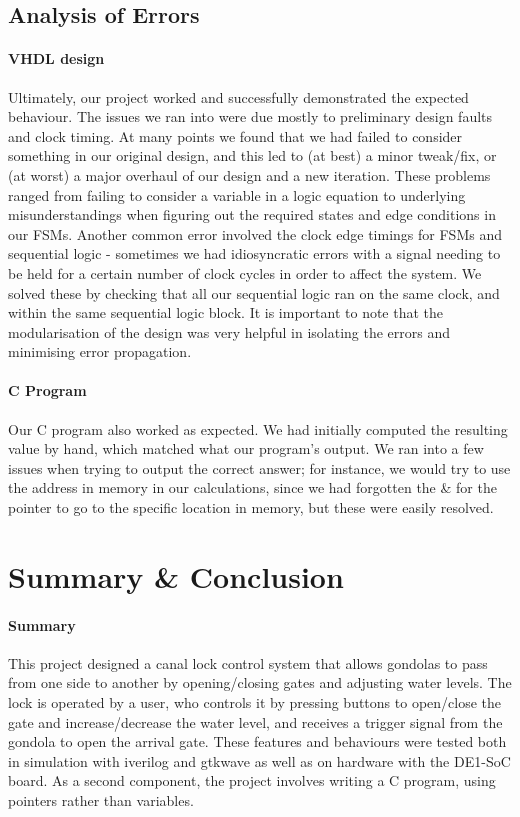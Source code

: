 \documentclass{article}
\begin{document}
	\subsection{Analysis of Errors}
  \paragraph{VHDL design} Ultimately, our project worked and successfully demonstrated the expected behaviour. The issues we ran into were due mostly to preliminary design faults and clock timing. At many points we found that we had failed to consider something in our original design, and this led to (at best) a minor tweak/fix, or (at worst) a major overhaul of our design and a new iteration. These problems ranged from failing to consider a variable in a logic equation to underlying misunderstandings when figuring out the required states and edge conditions in our FSMs. Another common error involved the clock edge timings for FSMs and sequential logic - sometimes we had idiosyncratic errors with a signal needing to be held for a certain number of clock cycles in order to affect the system. We solved these by checking that all our sequential logic ran on the same clock, and within the same sequential logic block. It is important to note that the modularisation of the design was very helpful in isolating the errors and minimising error propagation.

  \paragraph{C Program} Our C program also worked as expected. We had initially computed the resulting value by hand, which matched what our program's output. We ran into a few issues when trying to output the correct answer; for instance, we would try to use the address in memory in our calculations, since we had forgotten the \& for the pointer to go to the specific location in memory, but these were easily resolved.


\section{Summary \& Conclusion}
  \paragraph{Summary} This project designed a canal lock control system that allows gondolas to pass from one side to another by opening/closing gates and adjusting water levels. The lock is operated by a user, who controls it by pressing buttons to open/close the gate and increase/decrease the water level, and receives a trigger signal from the gondola to open the arrival gate. These features and behaviours were tested both in simulation with iverilog and gtkwave as well as on hardware with the DE1-SoC board. As a second component, the project involves writing a C program, using pointers rather than variables.
\end{document}
